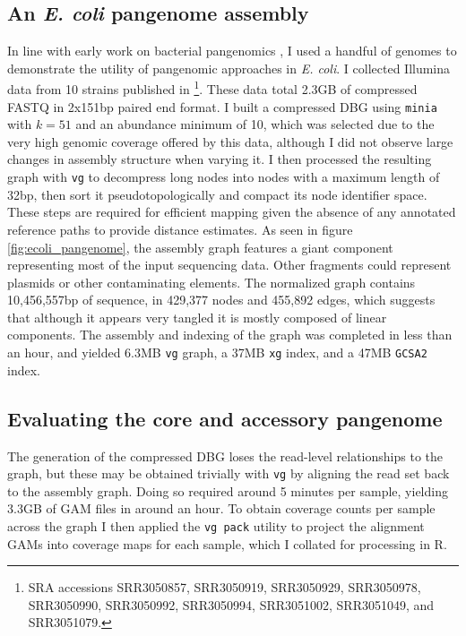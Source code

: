 \subsection{An \emph{E. coli} pangenome assembly}

In line with early work on bacterial pangenomics \cite{medini2005microbial}, I used a handful of genomes to demonstrate the utility of pangenomic approaches in \emph{E. coli}.
I collected Illumina data from 10 strains published in \cite{earle2016identifying}\footnote{SRA accessions SRR3050857, SRR3050919, SRR3050929, SRR3050978, SRR3050990, SRR3050992, SRR3050994, SRR3051002, SRR3051049, and SRR3051079.}.
These data total 2.3GB of compressed FASTQ in 2x151bp paired end format.
I built a compressed DBG using {\tt minia} with $k=51$ and an abundance minimum of 10, which was selected due to the very high genomic coverage offered by this data, although I did not observe large changes in assembly structure when varying it.
I then processed the resulting graph with {\tt vg} to decompress long nodes into nodes with a maximum length of 32bp, then sort it pseudotopologically and compact its node identifier space.
These steps are required for efficient mapping given the absence of any annotated reference paths to provide distance estimates.
As seen in figure \ref{fig:ecoli_pangenome}, the assembly graph features a giant component representing most of the input sequencing data.
Other fragments could represent plasmids or other contaminating elements.
The normalized graph contains 10,456,557bp of sequence, in 429,377 nodes and 455,892 edges, which suggests that although it appears very tangled it is mostly composed of linear components.
The assembly and indexing of the graph was completed in less than an hour, and yielded 6.3MB {\tt vg} graph, a 37MB {\tt xg} index, and a 47MB {\tt GCSA2} index.

\subsection{Evaluating the core and accessory pangenome}

The generation of the compressed DBG loses the read-level relationships to the graph, but these may be obtained trivially with {\tt vg} by aligning the read set back to the assembly graph.
Doing so required around 5 minutes per sample, yielding 3.3GB of GAM files in around an hour.
To obtain coverage counts per sample across the graph I then applied the {\tt vg pack} utility to project the alignment GAMs into coverage maps for each sample, which I collated for processing in R.


